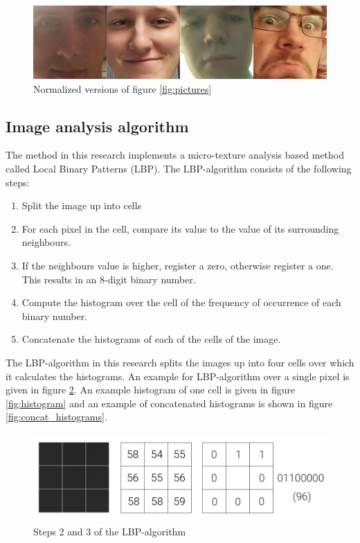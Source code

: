 \documentclass{sig-alternate-br}
\begin{document}
\begin{figure}[h]
	\includegraphics[scale=0.2]{normalized}
	\caption{Normalized versions of figure \ref{fig:pictures}}
	\label{fig:normalized}
\end{figure}


\subsection{Image analysis algorithm} \label{lbp}
The method in this research implements a micro-texture analysis based method called Local Binary Patterns (LBP). The LBP-algorithm consists of the following steps:
\begin{enumerate}
	\item Split the image up into cells
	\item For each pixel in the cell, compare its value to the value of its surrounding neighbours.
	\item If the neighbours value is higher, register a zero, otherwise register a one. This results in an 8-digit binary number.
	\item Compute the histogram over the cell of the frequency of occurrence of each binary number.
	\item Concatenate the histograms of each of the cells of the image.
\end{enumerate}

The LBP-algorithm in this research splits the images up into four cells over which it calculates the histograms. An example for LBP-algorithm over a single pixel is given in figure \ref{fig:lbp_pixel}. An example histogram of one cell is given in figure \ref{fig:histogram} and an example of concatenated histograms is shown in figure \ref{fig:concat_histograms}.

\begin{figure}[h]
	\includegraphics[scale=0.2]{lbp_pixel}
	\caption{Steps 2 and 3 of the LBP-algorithm}
	\label{fig:lbp_pixel}
\end{figure}
\end{document}
